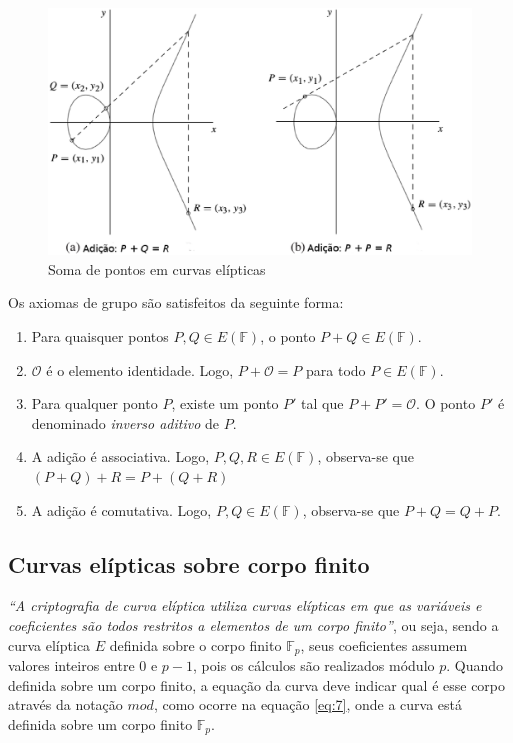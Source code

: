 \begin{figure}[h]
\includegraphics[scale=0.5, bb=0 0 484 636]{figuras/SomaECC.eps}
\caption{Soma de pontos em curvas elípticas}
\label{fig:pontos}
\end{figure}

Os axiomas de grupo são satisfeitos da seguinte forma:
\begin{enumerate}
  \item Para quaisquer pontos $P, Q \in E(\mathbb{F})$, o ponto $P + Q \in E(\mathbb{F})$.
  \item $\mathcal{O}$ é o elemento identidade. Logo, $P + \mathcal{O} = P$ para todo $P \in E(\mathbb{F})$.
  \item Para qualquer ponto \(P\), existe um ponto $P'$ tal que $P + P' = \mathcal{O}$. O ponto $P'$ é denominado \textit{inverso aditivo} de \(P\).
  \item A adição é associativa. Logo, $P, Q, R \in E(\mathbb{F})$, observa-se que $(P + Q) + R = P + (Q + R)$
  \item A adição é comutativa. Logo, $P, Q \in E(\mathbb{F})$, observa-se que $P + Q = Q + P$.
\end{enumerate}

%
%
\subsection{Curvas elípticas sobre corpo finito}
\textit{``A criptografia de curva elíptica utiliza curvas elípticas em que as variáveis e coeficientes são todos restritos a elementos de um corpo finito''}\cite{Stallings:2011}, ou seja, sendo a curva elíptica $E$ definida sobre o corpo finito $\mathbb{F}_p$, seus coeficientes assumem valores inteiros entre 0 e $p - 1$, pois os cálculos são realizados módulo \(p\). Quando definida sobre um corpo finito, a equação da curva deve indicar qual é esse corpo através da notação $mod$, como ocorre na equação \ref{eq:7}, onde a curva está definida sobre um corpo finito $\mathbb{F}_p$.

